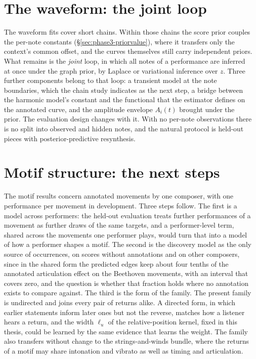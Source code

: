 \documentclass[11pt,a4paper]{report}
\begin{document}
\section{The waveform: the joint loop}
\label{sec:future-phase3}The waveform fits cover short chains. Within those
chains the score prior couples the per-note constants
(\S\ref{sec:phase3-priorvalue}), where it transfers only the context's
common offset, and the curves themselves still carry independent priors.
What remains is the \emph{joint} loop, in which all notes of a performance
are inferred at once under the graph prior, by Laplace or variational
inference over $z$. Three further components belong to that loop: a
transient model at the note boundaries, which the chain study indicates as
the next step, a bridge between the harmonic model's constant and the
functional that the estimator defines on the annotated curve, and the amplitude envelope $A_i(t)$ brought
under the prior. The evaluation design changes with it. With no per-note
observations there is no split into observed and hidden notes, and the
natural protocol is
held-out pieces with posterior-predictive resynthesis.

\section{Motif structure: the next steps}\label{sec:future-motif}
The motif results concern annotated movements by one composer, with one
performance per movement in development. Three steps follow. The first is a model across performers: the held-out evaluation
treats further performances of a movement as further draws of the same
targets, and a performer-level term, shared across the movements one
performer plays, would turn that into a model of how a performer shapes a
motif. The second is the discovery model as the only source of
occurrences, on scores without annotations and on other composers, since
in the shared form the predicted edges keep about four tenths of the
annotated articulation effect on the Beethoven movements, with an interval
that covers zero, and the question is whether that fraction holds where
no annotation exists to compare against. The third is the form of the
family. The present family is undirected and joins every pair of returns
alike. A directed form, in which earlier statements inform later ones but
not the reverse, matches how a listener hears a return, and the width
$\ell_u$ of the relative-position kernel, fixed in this thesis, could be
learned by the same evidence that learns the weight. The family also
transfers without change to the strings-and-winds bundle, where the
returns of a motif may share intonation and vibrato as well as timing and
articulation.
\end{document}
